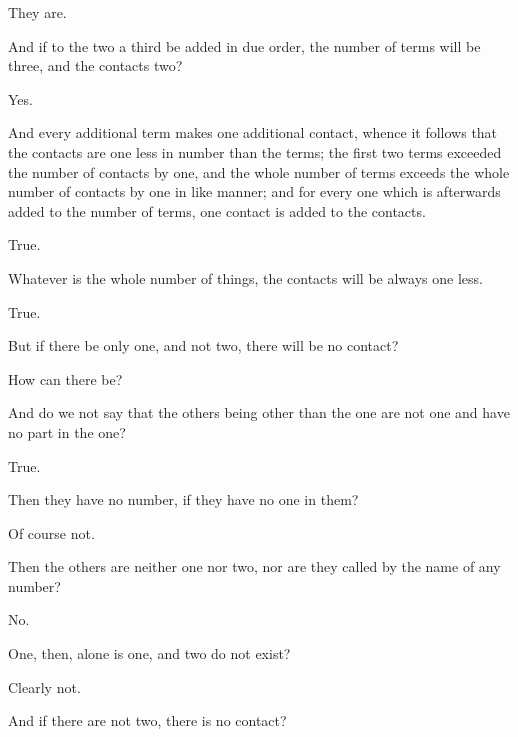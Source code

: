 \documentclass[11pt,letter]{article}
\begin{document}
\par  They are.

\par  And if to the two a third be added in due order, the number of terms will be three, and the contacts two?

\par  Yes.

\par  And every additional term makes one additional contact, whence it follows that the contacts are one less in number than the terms; the first two terms exceeded the number of contacts by one, and the whole number of terms exceeds the whole number of contacts by one in like manner; and for every one which is afterwards added to the number of terms, one contact is added to the contacts.

\par  True.

\par  Whatever is the whole number of things, the contacts will be always one less.

\par  True.

\par  But if there be only one, and not two, there will be no contact?

\par  How can there be?

\par  And do we not say that the others being other than the one are not one and have no part in the one?

\par  True.

\par  Then they have no number, if they have no one in them?

\par  Of course not.

\par  Then the others are neither one nor two, nor are they called by the name of any number?

\par  No.

\par  One, then, alone is one, and two do not exist?

\par  Clearly not.

\par  And if there are not two, there is no contact?
\end{document}

